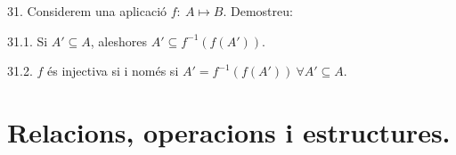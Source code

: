 \documentclass[11pt]{article}
\begin{document}
\begin{legal}[start=21]
\begin{legal}
		
		
		
	\end{legal}
	\item[31.] Considerem una aplicació $f: \ A\mapsto B$. Demostreu:
	\begin{legal}
		\item[31.1.] Si $A'\subseteq A$, aleshores $A'\subseteq f^{-1}(f(A'))$.
		\item[31.2.] $f$ és injectiva si i només si $A'=f^{-1}(f(A')) \ \forall A'\subseteq A$.
	\end{legal}
\end{legal}

\newpage

\section{Relacions, operacions i estructures.}
\end{document}
